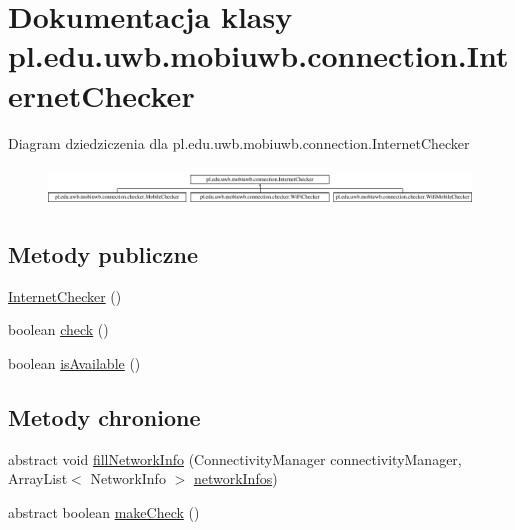 \hypertarget{classpl_1_1edu_1_1uwb_1_1mobiuwb_1_1connection_1_1_internet_checker}{}\section{Dokumentacja klasy pl.\+edu.\+uwb.\+mobiuwb.\+connection.\+Internet\+Checker}
\label{classpl_1_1edu_1_1uwb_1_1mobiuwb_1_1connection_1_1_internet_checker}
Diagram dziedziczenia dla pl.\+edu.\+uwb.\+mobiuwb.\+connection.\+Internet\+Checker\begin{figure}[H]
\begin{center}
\leavevmode
\includegraphics[height=1.031308cm]{classpl_1_1edu_1_1uwb_1_1mobiuwb_1_1connection_1_1_internet_checker}
\end{center}
\end{figure}
\subsection*{Metody publiczne}
\begin{DoxyCompactItemize}
\item 
\hyperlink{classpl_1_1edu_1_1uwb_1_1mobiuwb_1_1connection_1_1_internet_checker_abf0bb2eaeab83df0072e2d22a5465751}{Internet\+Checker} ()
\item 
boolean \hyperlink{classpl_1_1edu_1_1uwb_1_1mobiuwb_1_1connection_1_1_internet_checker_ab5056eecdb0947216b38ead65c5682c3}{check} ()
\item 
boolean \hyperlink{classpl_1_1edu_1_1uwb_1_1mobiuwb_1_1connection_1_1_internet_checker_a1e017231ef654d5ca99817522fbeb5ce}{is\+Available} ()
\end{DoxyCompactItemize}
\subsection*{Metody chronione}
\begin{DoxyCompactItemize}
\item 
abstract void \hyperlink{classpl_1_1edu_1_1uwb_1_1mobiuwb_1_1connection_1_1_internet_checker_a5b70be000c90b2e3a5660f0d7db4a162}{fill\+Network\+Info} (Connectivity\+Manager connectivity\+Manager, Array\+List$<$ Network\+Info $>$ \hyperlink{classpl_1_1edu_1_1uwb_1_1mobiuwb_1_1connection_1_1_internet_checker_a2edc06b95c5a74eee801d1dd2643b464}{network\+Infos})
\item 
abstract boolean \hyperlink{classpl_1_1edu_1_1uwb_1_1mobiuwb_1_1connection_1_1_internet_checker_a5dbe35705cd9ad04d08811e447632f2b}{make\+Check} ()
\end{DoxyCompactItemize}
